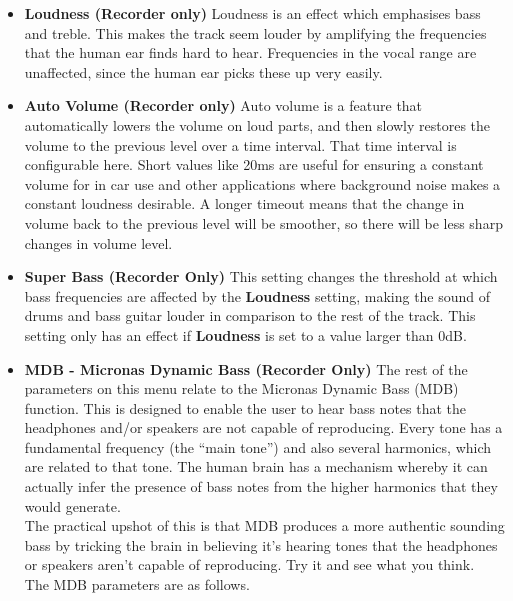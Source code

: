 \begin{itemize}
\item \textbf{Loudness (Recorder only)}
Loudness is an effect which emphasises bass and treble.  This makes the
track seem louder by amplifying the frequencies that the human ear
finds hard to hear.  Frequencies in the vocal range are unaffected,
since the human ear picks these up very easily.

\item \textbf{Auto Volume (Recorder only)}
Auto volume is a feature that automatically lowers the volume on loud
parts, and then slowly restores the volume to the previous level over a
time interval. That time interval is configurable here.  Short values
like 20ms are useful for ensuring a constant volume for in car use and
other applications where background noise makes a constant loudness
desirable.  A longer timeout means that the change in volume back to
the previous level will be smoother, so there will be less sharp
changes in volume level.

\item \textbf{Super Bass (Recorder Only)}
This setting changes the threshold at which bass frequencies are
affected by the \textbf{Loudness} setting, making the sound of drums
and bass guitar louder in comparison to the rest of the track.  This
setting only has an effect if \textbf{Loudness} is set to a value
larger than 0dB.

\item \textbf{MDB {}- Micronas Dynamic Bass (Recorder Only)}
The rest of the parameters on this menu relate to the Micronas Dynamic
Bass (MDB) function.  This is designed to enable the user to hear bass
notes that the headphones and/or speakers are not capable of
reproducing.  Every tone has a fundamental frequency (the ``main tone'') and also several harmonics, which are related to that tone.  The human brain has a
mechanism whereby it can actually infer the presence of bass notes from
the higher harmonics that they would generate.\\

The practical upshot of this is that MDB produces a more authentic
sounding bass by tricking the brain in believing it's
hearing tones that the headphones or speakers aren't
capable of reproducing.  Try it and see what you think.\\

The MDB parameters are as follows.


\end{itemize}
